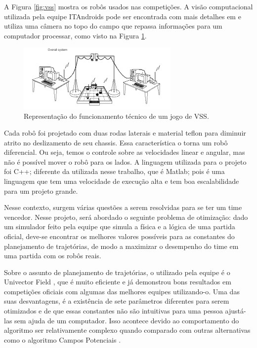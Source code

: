\documentclass[a4paper,12pt]{article}
\begin{document}
A Figura \ref{fig:vss} mostra os robôs usados nas competições. A visão computacional utilizada pela equipe ITAndroids pode ser encontrada com mais detalhes em \cite{small_vision} e utiliza uma câmera no topo do campo que repassa informações para um computador processar, como visto na Figura \ref{fig:funcioamento}.

\begin{figure}[H]
	\centering
		\includegraphics[width=0.7\textwidth]{figures/overview.png}
  \caption{Representação do funcionamento técnico de um jogo de VSS.}
	\label{fig:funcioamento}
\end{figure}

Cada robô foi projetado com duas rodas laterais e material teflon para diminuir atrito no deslizamento de seu chassis. Essa característica o torna um robô diferencial. Ou seja, temos o controle sobre as velocidades linear e angular, mas não é possível mover o robô para os lados. A linguagem utilizada para o projeto foi C++; diferente da utilizada nesse trabalho, que é Matlab; pois é uma linguagem que tem uma velocidade de execução alta e tem boa escalabilidade para um projeto grande. 

Nesse contexto, surgem várias questões a serem resolvidas para se ter um time vencedor. Nesse projeto, será abordado o seguinte problema de otimização: dado um simulador feito pela equipe que simula a física e a lógica de uma partida oficial, deve-se encontrar os melhores valores possíveis para as constantes do planejamento de trajetórias, de modo a maximizar o desempenho do time em uma partida com os robôs reais.

Sobre o assunto de planejamento de trajetórias, o utilizado pela equipe é o Univector Field \cite{univector}, que é muito eficiente e já demonstrou bons resultados em competições oficiais com algumas das melhores equipes utilizando-o. Uma das suas desvantagens, é a existência de sete parâmetros diferentes para serem otimizados e de que essas constantes não são intuitivas para uma pessoa ajustá-las sem ajuda de um computador. Isso acontece devido ao comportamento do algoritmo ser relativamente complexo quando comparado com outras alternativas como o algoritmo Campos Potenciais \cite{potential_fields}.
\end{document}
